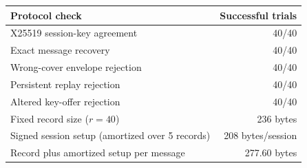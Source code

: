 \begin{tabular}{lr}
\toprule
\textbf{Protocol check} & \textbf{Successful trials} \\
\midrule
X25519 session-key agreement & 40/40 \\
Exact message recovery & 40/40 \\
Wrong-cover envelope rejection & 40/40 \\
Persistent replay rejection & 40/40 \\
Altered key-offer rejection & 40/40 \\
Fixed record size ($r=40$) & 236 bytes \\
Signed session setup (amortized over 5 records) & 208 bytes/session \\
Record plus amortized setup per message & 277.60 bytes \\
\bottomrule
\end{tabular}
